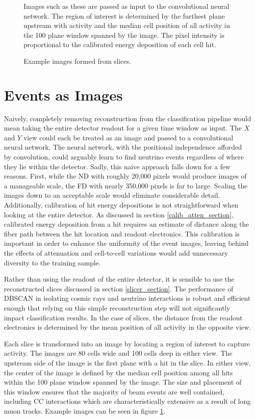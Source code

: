 \begin{figure}[t]
\caption{Example images formed from \nova slices.}{
Images such as these are passed as input to the convolutional neural network.
The region of interest is determined by the furthest plane upstream with
activity and the median cell position of all activity
in the 100 plane window spanned by the image.
The pixel intensity is proportional to the calibrated energy deposition
of each cell hit.}
\label{pixelmap}
\end{figure}
\clearpage

\section{\nova Events as Images}

Naively, completely removing reconstruction from the classification pipeline
would mean taking the entire detector readout for a given time window
as input.  The $X$ and $Y$ view could each be treated as an image and passed
to a convolutional neural network.
The neural network, with the positional independence afforded by convolution,
could arguably learn to find neutrino events regardless of where they lie
within the detector.
Sadly, this naive approach falls down for a few reasons.
First, while the ND with roughly 20,000 pixels would produce images of a
manageable scale, the FD with nearly 350,000 pixels is far to large.
Scaling the images down to an acceptable scale would eliminate considerable
detail.
Additionally, calibration of hit energy depositions is not straightforward
when looking at the entire detector.
As discussed in section \ref{calib_atten_section}, calibrated energy deposition
from a hit requires an estimate of distance along the fiber path
between the hit location and readout electronics.
This calibration is important in order to enhance the uniformity of the
event images, leaving behind the effects of attenuation and cell-to-cell
variations would add unnecessary diversity to the training sample.

Rather than using the readout of the entire detector, it is sensible to use
the reconstructed slices discussed in section \ref{slicer_section}.
The performance of DBSCAN in isolating cosmic rays and neutrino interactions
is robust and efficient enough \cite{baird2015thesis} that relying on this
simple reconstruction step will not significantly impact classification
results.
In the case of slices, the distance from the readout electronics is determined
by the mean position of all activity in the opposite view.

Each slice is transformed into an image by locating a region of interest to
capture activity.  The images are 80 cells wide and 100 cells deep in either
view.
The upstream side of the image is the first plane with a hit
in the slice.  In either view, the center of the image is defined by the
median cell position among all hits within the 100 plane window spanned by the
image.
The size and placement of this window ensures that the majority of beam events
are well contained, including \numu CC interactions which are
characteristically extensive as a result of long muon tracks.
Example images can be seen in figure \ref{pixelmap}.

